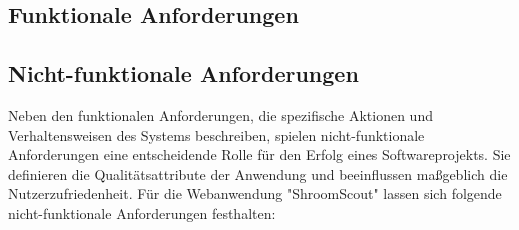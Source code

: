 \documentclass[../main.tex]{subfiles}
\begin{document}
\subsection{Funktionale Anforderungen} %

\subsection{Nicht-funktionale Anforderungen} %

Neben den funktionalen Anforderungen, die spezifische Aktionen und Verhaltensweisen des Systems beschreiben, spielen 
nicht-funktionale Anforderungen eine entscheidende Rolle für den Erfolg eines Softwareprojekts. Sie definieren die 
Qualitätsattribute der Anwendung und beeinflussen maßgeblich die Nutzerzufriedenheit. Für die Webanwendung "ShroomScout" 
lassen sich folgende nicht-funktionale Anforderungen festhalten:
\end{document}
